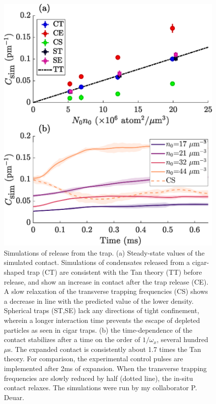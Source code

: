 	\begin{figure}
	        \includegraphics[width=\columnwidth]{fig/QD/sim_results.eps}
	        \caption{Simulations of release from the trap. (a) Steady-state values of the simulated contact. Simulations of condensates released from a cigar-shaped trap (CT) are consistent with the Tan theory (TT) before release, and show an increase in contact after the trap release (CE). A slow relaxation of the transverse trapping frequencies (CS) shows a decrease in line with the predicted value of the lower density. Spherical traps (ST,SE) lack any directions of tight confinement, wherein a longer interaction time prevents the escape of depleted particles as seen in cigar traps. (b) the time-dependence of the contact stabilizes after a time on the order of $1/\omega_x$, several hundred $\mu$s. The expanded contact is consistently about 1.7 times the Tan theory. For comparison, the experimental control pulses are implemented after 2ms of expansion. When the transverse trapping frequencies are slowly reduced by half (dotted line), the in-situ contact relaxes. The simulations were run by my collaborator P. Deuar.}
	        \label{fig:sim_fig}
	\end{figure}
	
